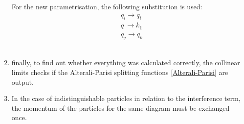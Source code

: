 \begin{enumerate}
For the new parametrisation, the following substitution is used:
\begin{equation}
\begin{split}
&q_i \rightarrow q_i\\
&q \: \rightarrow k_1\\
&q_j \rightarrow q_k
\end{split}
\end{equation}
\\
\item finally, to find out whether everything was calculated correctly, the collinear limits checks if the Alterali-Parisi splitting functions  \ref{Alterali-Parisi} are output.
\\
\item In the case of indistinguishable particles in relation to the interference term, the momentum of the particles for the same diagram must be exchanged once.
\end{enumerate}
